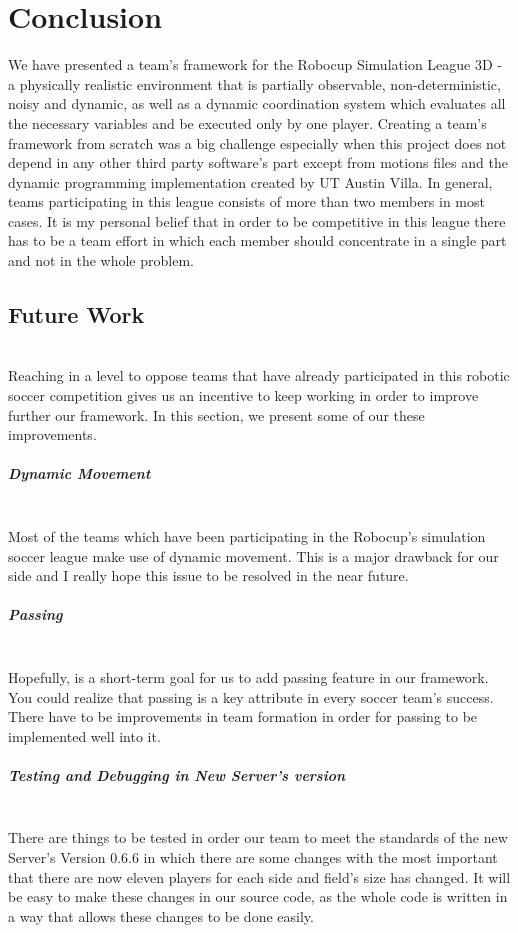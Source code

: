 \chapter{Conclusion}
\label{conclusion}

We have presented a team's framework for the Robocup Simulation League 3D - a physically realistic environment that is partially observable, non-deterministic, noisy and dynamic, as well as a dynamic coordination system which evaluates all the necessary variables and be executed only by one player. Creating a team's framework from scratch was a big challenge especially when this project does not depend in any other third party software's part except from motions files and the dynamic programming implementation created by UT Austin Villa. In general, teams participating in this league consists of more than two members in most cases. It is my personal belief that in order to be competitive in this league there has to be a team effort in which each member should concentrate in a single part and not in the whole problem.

\section{Future Work}\mbox{} \\
Reaching in a level to oppose teams that have already participated in this robotic soccer competition gives us an incentive to keep working in order to improve further our framework. In this section, we present some of our these improvements.  

\paragraph{Dynamic Movement}\mbox{} \\
Most of the teams which have been participating in the Robocup's simulation soccer league make use of dynamic movement. This is a major drawback for our side and I really hope this issue to be resolved in the near future.
\paragraph{Passing}\mbox{} \\
Hopefully, is a short-term goal for us to add passing feature in our framework. You could realize that passing is a key attribute in every soccer team's success. There have to be improvements in team formation in order for passing to be implemented well into it.
\paragraph{Testing and Debugging in New Server's version}\mbox{} \\
There are things to be tested in order our team to meet the standards of the new Server's Version 0.6.6 in which there are some changes with the most important that there are now eleven players for each side and field's size has changed. It will be easy to make these changes in our source code, as the whole code is written in a way that allows these changes to be done easily.
